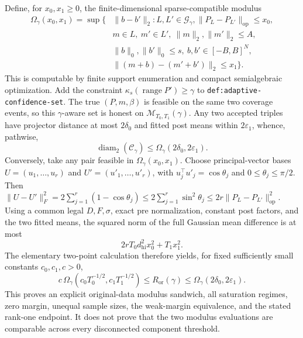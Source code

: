 Define, for \(x_0,x_1\ge0\), the finite-dimensional sparse-compatible modulus
\[
 \begin{aligned}
 \Omega_\gamma(x_0,x_1)=\sup\{&\lVert b-b'\rVert_2:
 L,L'\in\mathcal G_\gamma,
 \lVert P_L-P_{L'}\rVert_{\mathrm{op}}\le x_0,\\
 &m\in L,\ m'\in L',\ \lVert m\rVert_2,\lVert m'\rVert_2\le A,\\
 &\lVert b\rVert_0,\lVert b'\rVert_0\le s,
 \ b,b'\in[-B,B]^N,\\
 &\lVert(m+b)-(m'+b')\rVert_2\le x_1\}.
 \end{aligned}
\]
This is computable by finite support enumeration and compact semialgebraic optimization.  Add the constraint \(\kappa_s(\operatorname{range}P')\ge\gamma\) to \texttt{def:adaptive-confidence-set}.  The true \((P,m,\beta)\) is feasible on the same two coverage events, so this \(\gamma\)-aware set is honest on \(\mathcal M_{T_0,T_1}(\gamma)\).  Any two accepted triples have projector distance at most \(2\delta_0\) and fitted post means within \(2\varepsilon_1\), whence, pathwise,
\[
 \operatorname{diam}_2(\mathcal C_\gamma)
 \le\Omega_\gamma(2\delta_0,2\varepsilon_1).
\]
Conversely, take any pair feasible in \(\Omega_\gamma(x_0,x_1)\).  Choose principal-vector bases \(U=(u_1,\ldots,u_r)\) and \(U'=(u'_1,\ldots,u'_r)\), with \(u_j^{\top}u'_j=\cos\theta_j\) and \(0\le\theta_j\le\pi/2\).  Then
\(
 \lVert U-U'\rVert_F^2
 =2\sum_{j=1}^r(1-\cos\theta_j)
 \le2\sum_{j=1}^r\sin^2\theta_j
 \le2r\lVert P_L-P_{L'}\rVert_{\mathrm{op}}^2.
\)
Using a common legal \(D,F,\sigma\), exact pre normalization, constant post factors, and the two fitted means, the squared norm of the full Gaussian mean difference is at most
\[
 2rT_0d_{\mathrm{hi}}^2x_0^2+T_1x_1^2.
\]
The elementary two-point calculation therefore yields, for fixed sufficiently small constants \(c_0,c_1,c>0\),
\[
 c\,\Omega_\gamma(c_0T_0^{-1/2},c_1T_1^{-1/2})
 \le R_{\mathrm{or}}(\gamma)
 \le\Omega_\gamma(2\delta_0,2\varepsilon_1).
\]
This proves an explicit original-data modulus sandwich, all saturation regimes, zero margin, unequal sample sizes, the weak-margin equivalence, and the stated rank-one endpoint.  It does not prove that the two modulus evaluations are comparable across every disconnected component threshold.
